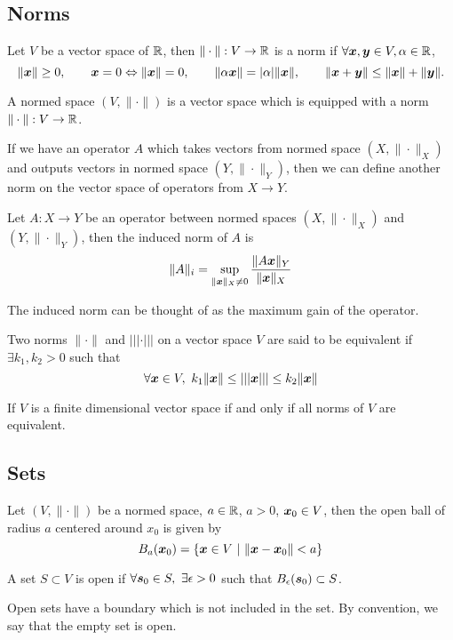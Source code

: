\subsection{Norms}
\begin{definition}
	Let $V$ be a vector space of $\mathbb{R}$, then $\|\cdot\|: V \to \mathbb{R}$ is a norm if
	$\forall \boldsymbol{x},\boldsymbol{y}\in V, \alpha \in \mathbb{R}$, \[
		\|\boldsymbol{x}\| \geq 0, \qquad \boldsymbol{x} = 0 \Leftrightarrow \|\boldsymbol{x}\| = 0, \qquad
		\|\alpha \boldsymbol{x}\| = |\alpha|\|\boldsymbol{x}\|, \qquad \|\boldsymbol{x} + \boldsymbol{y}\| \leq
		\|\boldsymbol{x}\| + \|\boldsymbol{y}\|.
	\]
	\label{defn:norm}
\end{definition}
\begin{definition}
	A normed space $(V, \|\cdot\|)$ is a vector space which is equipped with a
	norm $\|\cdot\|: V \to \mathbb{R}$.
	\label{defn:normed-space}
\end{definition}
If we have an operator $A$ which takes vectors from normed space $(X,
\|\cdot\|_X)$ and outputs vectors in normed space $(Y, \|\cdot\|_Y)$, then we
can define another norm on the vector space of operators from $X\to Y$.
\begin{definition}
	Let $A:X\to Y$ be an operator between normed spaces $(X, \|\cdot\|_X)$ and
	$(Y, \|\cdot\|_Y)$, then the induced norm of $A$ is \[
		\|A\|_i = \sup_{\|\boldsymbol{x}\|_X \neq 0} \frac{\|A\boldsymbol{x}\|_Y}{\|\boldsymbol{x}\|_X}
	\]
	\label{defn:induced-norm}
\end{definition}
The induced norm can be thought of as the maximum gain of the operator.
\begin{definition}
	Two norms $\|\cdot\|$ and $|||\cdot|||$ on a vector space $V$ are said to be
	equivalent if $\exists k_1,
	k_2 > 0$ such that \[
		\forall \boldsymbol{x}\in V,\ k_1\|\boldsymbol{x}\| \leq |||\boldsymbol{x}||| \leq k_2\|\boldsymbol{x}\|
	\]
	\label{defn:equivalent-norm}
\end{definition}
If $V$ is a finite dimensional vector space if and only if all norms of $V$ are
equivalent.

\subsection{Sets}
\begin{definition}
	Let $(V, \|\cdot\|)$ be a normed space, $a\in \mathbb{R}$, $a > 0$, $\boldsymbol{x}_0\in V$,
	then the open ball of radius $a$ centered around $x_0$ is given by \[
		B_a(\boldsymbol{x}_0) = \{ \boldsymbol{x} \in V \ | \ \|\boldsymbol{x} - \boldsymbol{x}_0\| < a \}
	\]
	\label{defn:open-ball}
\end{definition}
\begin{definition}
	A set $S\subset V$ is open if $\forall \boldsymbol{s}_0\in S,\ \exists \epsilon > 0$
	such that $B_\epsilon(\boldsymbol{s}_0) \subset S$.
	\label{defn:open-set}
\end{definition}
Open sets have a boundary which is not included in the set. By convention, we
say that the empty set is open.

